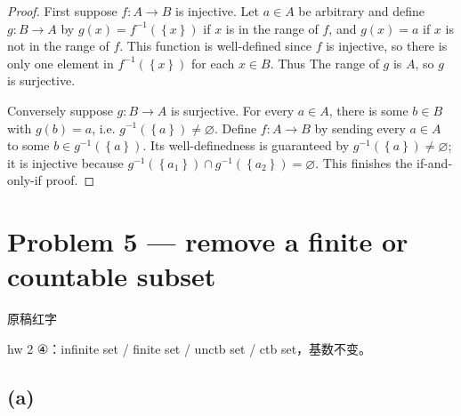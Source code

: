 \begin{proof}

First suppose \(f:A\rightarrow B\) is injective. Let \(a \in A\) be arbitrary and define \(g:B\rightarrow A\) by \(g(x) = f^{- 1}\left( \left\{ x \right\} \right)\) if \(x\) is in the range of \(f\), and \(g(x) = a\) if \(x\) is not in the range of \(f\). This function is well-defined since \(f\) is injective, so there is only one element in \(f^{- 1}\left( \left\{ x \right\} \right)\) for each \(x \in B\). Thus The range of \(g\) is \(A\), so \(g\) is surjective.

Conversely suppose \(g:B\rightarrow A\) is surjective. For every \(a \in A\), there is some \(b \in B\) with \(g(b) = a\), i.e. \(g^{- 1}\left( \left\{ a \right\} \right) \neq \varnothing\). Define \(f:A\rightarrow B\) by sending every \(a \in A\) to some \(b \in g^{- 1}\left( \left\{ a \right\} \right)\). Its well-definedness is guaranteed by \(g^{- 1}\left( \left\{ a \right\} \right) \neq \varnothing\); it is injective because \(g^{- 1}\left( \left\{ a_{1} \right\} \right) \cap g^{- 1}\left( \left\{ a_{2} \right\} \right) = \varnothing\). This finishes the if-and-only-if proof.

\end{proof}

\section{Problem 5 --- remove a finite or countable subset}

\begin{qlnote}{原稿红字}

hw 2 ④：infinite set / finite set / unctb set / ctb set，基数不变。

\end{qlnote}

\subsection{(a)}

